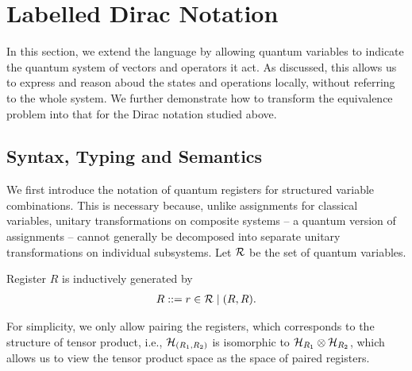 
\newcommand {\cD } {{\mathcal{D}}}
\newcommand {\cl } {{\mathit{cl}}}


\section{Labelled Dirac Notation}
\label{sec: labelled}









In this section, we extend the language by allowing quantum variables to indicate the quantum system of vectors and operators it act. 
As discussed, this allows us to express and reason aboud the states and operations locally, without referring to the whole system. 
We further demonstrate how to transform the equivalence problem into that for the Dirac notation studied above.

\subsection{Syntax, Typing and Semantics}
We first introduce the notation of quantum registers for structured variable combinations. This is necessary because, unlike assignments for classical variables, unitary transformations on composite systems -- a quantum version of assignments -- cannot generally be decomposed into separate unitary transformations on individual subsystems.
Let $\mathcal{R}$ be the set of quantum variables.
\begin{definition} Register $R$ is inductively generated by
  \begin{align*}
    R ::= r\in\mathcal{R} \mid (R, R).
  \end{align*}
\end{definition}
For simplicity, we only allow pairing the registers, which corresponds to the structure of tensor product, i.e., ${\mathcal{H}}_{(R_1,R_2)}$ is isomorphic to ${\mathcal{H}}_{R_1}\otimes {\mathcal{H}}_{R_2}$, which allows us to view the tensor product space as the space of paired registers.

